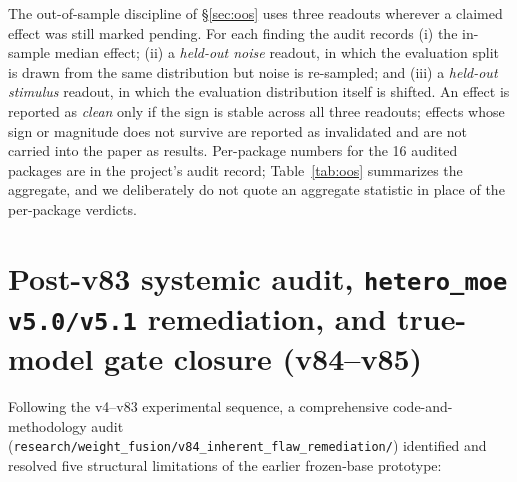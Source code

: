 \documentclass[10pt]{article}
\theoremstyle{definition}
\theoremstyle{plain}
\theoremstyle{remark}
\begin{document}
The out-of-sample discipline of \S\ref{sec:oos} uses three readouts wherever a claimed effect was still marked pending. For each finding the audit records (i) the in-sample median effect; (ii) a \emph{held-out noise} readout, in which the evaluation split is drawn from the same distribution but noise is re-sampled; and (iii) a \emph{held-out stimulus} readout, in which the evaluation distribution itself is shifted. An effect is reported as \emph{clean} only if the sign is stable across all three readouts; effects whose sign or magnitude does not survive are reported as invalidated and are not carried into the paper as results. Per-package numbers for the 16 audited packages are in the project's audit record; Table~\ref{tab:oos} summarizes the aggregate, and we deliberately do not quote an aggregate statistic in place of the per-package verdicts.

\section{Post-v83 systemic audit, \texttt{hetero\_moe v5.0/v5.1} remediation, and true-model gate closure (v84--v85)}
\label{app:v84}

Following the v4--v83 experimental sequence, a comprehensive code-and-methodology audit (\texttt{research/weight\_fusion/v84\_inherent\_flaw\_remediation/}) identified and resolved five structural limitations of the earlier frozen-base prototype:
\end{document}
